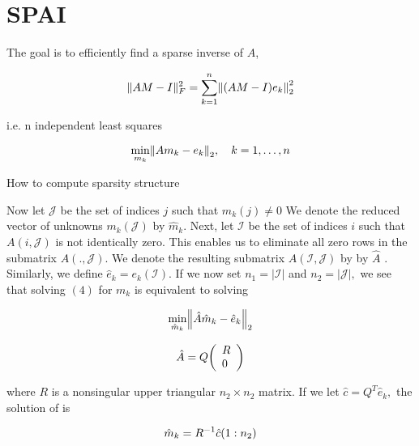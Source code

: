 \documentclass[paper=A4, fontsize=11pt]{scrartcl}
\let\originalleft\left
\let\originalright\right
\renewcommand{\left}{\mathopen{}\mathclose\bgroup\originalleft}
\renewcommand{\right}{\aftergroup\egroup\originalright}
\theoremstyle{remark}
\begin{document}
	\newpage
	
	\section{SPAI}
	
	The goal is to efficiently find a sparse inverse of $A$, 
	
	\begin{equation}
	\|A M-I\|_{F}^{2}=\sum_{k=1}^{n}\left\|(A M-I) e_{k}\right\|_{2}^{2}
	\end{equation}
	
	i.e. n independent least squares
	
	
	\begin{equation}
	\min _{m_{k}}\left\|A m_{k}-e_{k}\right\|_{2}, \quad k=1, \ldots, n
	\end{equation}
	
	
	How to compute sparsity structure 
	
	Now let \(\mathcal{J}\) be the set of indices \(j\) such that \(m_{k}(j) \neq 0\) We denote the reduced vector of unknowns \(m_{k}(\mathcal{J})\) by \(\hat{m}_{k} .\) Next, let \(\mathcal{I}\) be the set of
	indices \(i\) such that \(A(i, \mathcal{J})\) is not identically zero. This enables us to eliminate all zero rows in the submatrix \(A( ., \mathcal{J}) .\) We denote the resulting submatrix \(A(\mathcal{I}, \mathcal{J})\) by by
	\(\hat{A}\) . Similarly, we define \(\hat{e}_{k}=e_{k}(\mathcal{I}) .\) If we now set \(n_{1}=|\mathcal{I}|\) and \(n_{2}=|\mathcal{J}|,\) we see that
	solving \((4)\) for \(m_{k}\) is equivalent to solving
	
	\begin{equation}
	\min _{\hat{m}_{k}}\left\|\hat{A} \hat{m}_{k}-\hat{e}_{k}\right\|_{2}
	\end{equation}
	
	
	
	\begin{equation}
	\hat{A}=Q\left(\begin{array}{l}{R} \\ {0}\end{array}\right)
	\end{equation}
	
	where \(R\) is a nonsingular upper triangular \(n_{2} \times n_{2}\) matrix. If we let \(\hat{c}=Q^{T} \hat{e}_{k},\) the
	solution of  is
	
	\begin{equation}
	\hat{m}_{k}=R^{-1} \hat{c}\left(1 : n_{2}\right)
	\end{equation}
	
\end{document}
